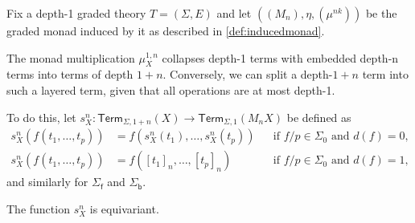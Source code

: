\documentclass[a4paper,UKenglish,cleveref,thm-restate,numberwithinsect,final]{lipics-v2021}
\newcommand{\Term}{\mathsf{Term}}
\newcommand{\sig}{\Sigma}
\newcommand{\sigp}{\Sigma_0}
\newcommand{\sigf}{\Sigma_{\mathsf f}}
\newcommand{\sigb}{\Sigma_{\mathsf b}}
\theoremstyle{plain}
\numberwithin{equation}{section}
\newcommand{\+}[1]{\mathcal{#1}\xspace}
\theoremstyle{definition}
\begin{document}
Fix a depth-1 graded theory \(T = (\sig, E)\) and let
\(((M_n), \eta, (\mu^{nk}))\) be the graded monad induced by it as
described in \cref{def:inducedmonad}.

The monad multiplication \(\mu^{1, n}_X\) collapses depth-1 terms with embedded depth-n terms into terms of depth \(1 + n\).
Conversely, we can split a depth-\(1 + n\) term into such a layered term, given that all operations are at most depth-1.

To do this, let \(s^n_X: \Term_{\sig, 1 + n}(X) \to \Term_{\sig, 1}(M_n X)\) be defined as
\begin{align*}
    s^n_X(f(t_1, \ldots, t_p)) &= f(s^n_X(t_1), \ldots, s^n_X(t_p)) && \text{if } f/p \in \sigp \text{ and } d(f) = 0, \\
    s^n_X(f(t_1, \ldots, t_p)) &= f([t_1]_n, \ldots, [t_p]_n) && \text{if } f/p \in \sigp \text{ and } d(f) = 1,
\end{align*}
and similarly for \(\sigf\) and \(\sigb\).

\begin{lemma}\label{thm:splitequivariance}
    The function \(s^n_X\) is equivariant.
\end{lemma}
\end{document}
